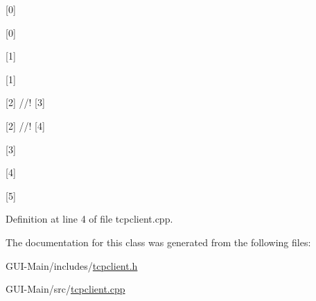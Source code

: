 \mbox{[}0\mbox{]} 

\mbox{[}0\mbox{]}

\mbox{[}1\mbox{]}

\mbox{[}1\mbox{]}

\mbox{[}2\mbox{]} //! \mbox{[}3\mbox{]}

\mbox{[}2\mbox{]} //! \mbox{[}4\mbox{]}

\mbox{[}3\mbox{]}

\mbox{[}4\mbox{]}

\mbox{[}5\mbox{]} 

Definition at line 4 of file tcpclient.\+cpp.



The documentation for this class was generated from the following files\+:\begin{DoxyCompactItemize}
\item 
G\+U\+I-\/\+Main/includes/\hyperlink{tcpclient_8h}{tcpclient.\+h}\item 
G\+U\+I-\/\+Main/src/\hyperlink{tcpclient_8cpp}{tcpclient.\+cpp}\end{DoxyCompactItemize}
